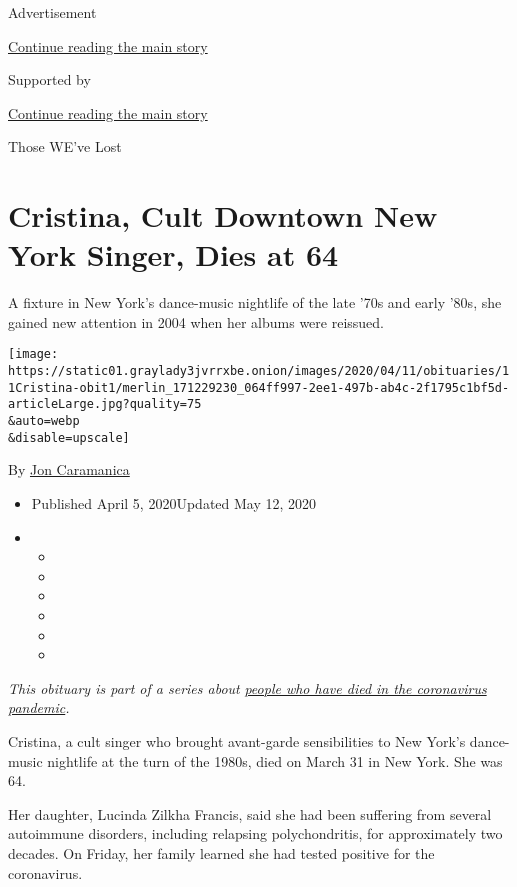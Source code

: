 Advertisement

\protect\hyperlink{after-top}{Continue reading the main story}

Supported by

\protect\hyperlink{after-sponsor}{Continue reading the main story}

Those WE've Lost

\hypertarget{cristina-cult-downtown-new-york-singer-dies-at-64}{%
\section{Cristina, Cult Downtown New York Singer, Dies at
64}\label{cristina-cult-downtown-new-york-singer-dies-at-64}}

A fixture in New York's dance-music nightlife of the late '70s and early
'80s, she gained new attention in 2004 when her albums were reissued.

\texttt{[image: https://static01.graylady3jvrrxbe.onion/images/2020/04/11/obituaries/11Cristina-obit1/merlin\_171229230\_064ff997-2ee1-497b-ab4c-2f1795c1bf5d-articleLarge.jpg?quality=75\\\&auto=webp\\\&disable=upscale]}

By \href{https://www.nytimes3xbfgragh.onion/by/jon-caramanica}{Jon
Caramanica}

\begin{itemize}
\item
  Published April 5, 2020Updated May 12, 2020
\item
  \begin{itemize}
  \item
  \item
  \item
  \item
  \item
  \item
  \end{itemize}
\end{itemize}

\emph{This obituary is part of a series about}
\href{https://www.nytimes3xbfgragh.onion/series/people-who-have-died-of-the-coronavirus}{\emph{people
who have died in the coronavirus pandemic}}\emph{.}

Cristina, a cult singer who brought avant-garde sensibilities to New
York's dance-music nightlife at the turn of the 1980s, died on March 31
in New York. She was 64.

Her daughter, Lucinda Zilkha Francis, said she had been suffering from
several autoimmune disorders, including relapsing polychondritis, for
approximately two decades. On Friday, her family learned she had tested
positive for the coronavirus.


